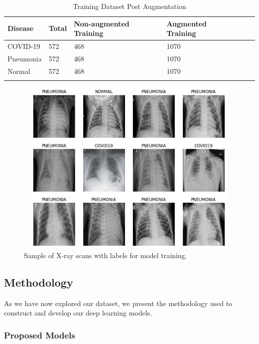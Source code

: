 \begin{longtable}{| p{} | p{} | p{} | p{} | p{} | p{} |} 

    \hline
\textbf{Disease} & \textbf{Total}    & \textbf{Non-augmented Training}   &\textbf{Augmented Training} \\
\hline
			COVID-19    &572   &468    &1070
\\\hline
			Pneumonia   &572   &468    &1070
\\\hline
			Normal      &572   &468    &1070
\\\hline 

\caption{Training Dataset Post Augmentation}

  \label{tab:Dataset Info}
    \end{longtable}

\begin{figure}[H]
	\centering
	\includegraphics[width=12cm, height=8.5cm]{Images/SampleScans.png}
	
	\caption{\small Sample of X-ray scans with labels for model training.}
	\label{fig:xray data}
\end{figure}

\subsection{Methodology}

As we have now explored our dataset, we present the methodology used to construct and develop our deep learning models.  


\subsubsection{Proposed Models}

